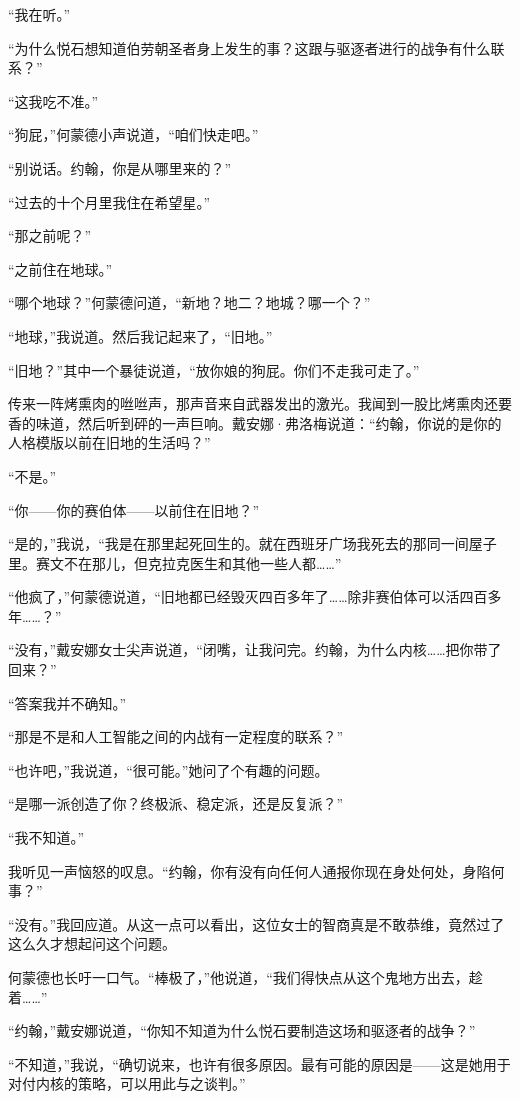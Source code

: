 \documentclass[AutoFakeBold=true]{book}
\begin{document}
``我在听。''

``为什么悦石想知道伯劳朝圣者身上发生的事？这跟与驱逐者进行的战争有什么联系？''

``这我吃不准。''

``狗屁，''何蒙德小声说道，``咱们快走吧。''

``别说话。约翰，你是从哪里来的？''

``过去的十个月里我住在希望星。''

``那之前呢？''

``之前住在地球。''

``哪个地球？''何蒙德问道，``新地？地二？地城？哪一个？''

``地球，''我说道。然后我记起来了，``旧地。''

``{\kaishu 旧地}？''其中一个暴徒说道，``放你娘的狗屁。你们不走我可走了。''

传来一阵烤熏肉的咝咝声，那声音来自武器发出的激光。我闻到一股比烤熏肉还要香的味道，然后听到砰的一声巨响。戴安娜·弗洛梅说道：``约翰，你说的是你的人格模版以前在旧地的生活吗？''

``不是。''

``{\kaishu 你}——你的赛伯体——以前住在旧地？''

``是的，''我说，``我是在那里起死回生的。就在西班牙广场我死去的那同一间屋子里。赛文不在那儿，但克拉克医生和其他一些人都……''

``他{\kaishu 疯}了，''何蒙德说道，``旧地都已经毁灭四百多年了……除非赛伯体可以活四百多年……？''

``没有，''戴安娜女士尖声说道，``闭嘴，让我问完。约翰，为什么内核……把你带了回来？''

``答案我并不确知。''

``那是不是和人工智能之间的内战有一定程度的联系？''

``也许吧，''我说道，``很可能。''她问了个有趣的问题。

``是哪一派创造了你？终极派、稳定派，还是反复派？''

``我不知道。''

我听见一声恼怒的叹息。``约翰，你有没有向任何人通报你现在身处何处，身陷何事？''

``没有。''我回应道。从这一点可以看出，这位女士的智商真是不敢恭维，竟然过了这么久才想起问这个问题。

何蒙德也长吁一口气。``棒极了，''他说道，``我们得快点从这个鬼地方出去，趁着……''

``约翰，''戴安娜说道，``你知不知道为什么悦石要制造这场和驱逐者的战争？''

``不知道，''我说，``确切说来，也许有很多原因。最有可能的原因是——这是她用于对付内核的策略，可以用此与之谈判。''
\end{document}
